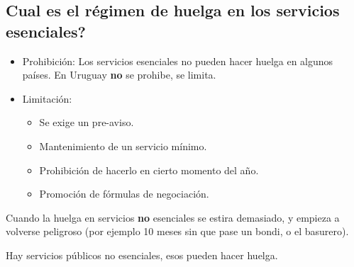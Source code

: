 \documentclass[spanish,12pt,a4paper,titlepage]{report}
\begin{document}
\subsection{Cual es el régimen de huelga en los servicios esenciales?}

\begin{itemize}
\item Prohibición: Los servicios esenciales no pueden hacer huelga en algunos países. En Uruguay \textbf{no} se prohibe, se limita.
\item Limitación:
  \begin{itemize}
  \item Se exige un pre-aviso.
  \item Mantenimiento de un servicio mínimo.
  \item Prohibición de hacerlo en cierto momento del año.
  \item Promoción de fórmulas de negociación.
  \end{itemize}
\end{itemize}

Cuando la huelga en servicios \textbf{no} esenciales se estira demasiado, y empieza a volverse peligroso (por ejemplo 10 meses sin que pase un bondi, o el basurero).

Hay servicios públicos no esenciales, esos pueden hacer huelga.
\end{document}
